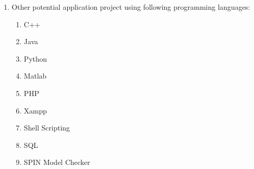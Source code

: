 \documentclass{article}
\begin{document}
\begin{enumerate}
\item Other potential application project using following programming languages:
\begin{enumerate}
\item C++
\item Java
\item Python
\item Matlab
\item PHP 
\item Xampp
\item Shell Scripting
\item SQL
\item SPIN Model Checker
\end{enumerate}	
\end{enumerate}
\end{document}
